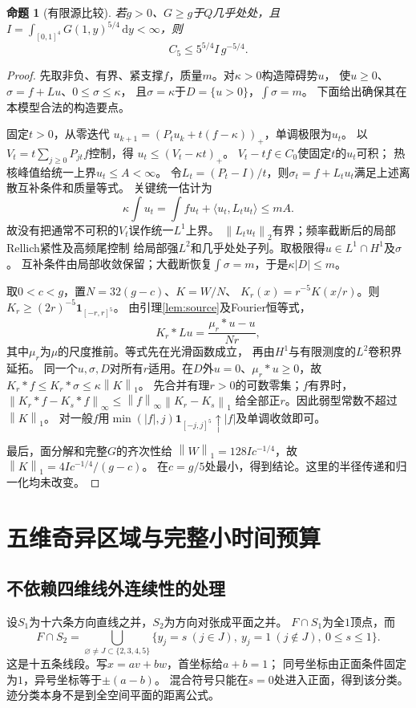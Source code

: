\documentclass[UTF8,fontset=fandol,zihao=-4,a4paper]{ctexart}
\newtheorem{proposition}[theorem]{命题}
\newcommand{\1}{\mathbf 1}
\newcommand{\dd}{\,\mathrm d}
\newcommand{\norm}[1]{\left\lVert#1\right\rVert}
\begin{document}
\begin{proposition}[有限源比较]\label{prop:transfer}
若$g>0$、$G\ge g$于$Q$几乎处处，且
$I=\int_{[0,1]^4}G(1,y)^{5/4}\dd y<\infty$，则
\[
 C_5\le5^{5/4}I\,g^{-5/4}.
\]
\end{proposition}
\begin{proof}
先取非负、有界、紧支撑$f$，质量$m$。对$\kappa>0$构造障碍势$u$，
使$u\ge0$、$\sigma=f+Lu$、$0\le\sigma\le\kappa$，
且$\sigma=\kappa$于$D=\{u>0\}$，$\int\sigma=m$。
下面给出确保其在本模型合法的构造要点。

固定$t>0$，从零迭代
$u_{k+1}=(P_tu_k+t(f-\kappa))_+$，单调极限为$u_t$。
以$V_t=t\sum_{j\ge0}P_{jt}f$控制，得
$u_t\le(V_t-\kappa t)_+$。
$V_t-tf\in C_0$使固定$t$的$u_t$可积；
热核峰值给统一上界$u_t\le A<\infty$。
令$L_t=(P_t-I)/t$，则$\sigma_t=f+L_tu_t$满足上述离散互补条件和质量等式。
关键统一估计为
\[
 \kappa\int u_t=\int fu_t+\langle u_t,L_tu_t\rangle\le mA.
\]
故没有把通常不可积的$V_t$误作统一$L^1$上界。
$\norm{L_tu_t}_2$有界；频率截断后的局部Rellich紧性及高频尾控制
给局部强$L^2$和几乎处处子列。取极限得$u\in L^1\cap H^1$及$\sigma$。
互补条件由局部收敛保留；大截断恢复$\int\sigma=m$，于是$\kappa|D|\le m$。

取$0<c<g$，置$N=32(g-c)$、$K=W/N$、
$K_r(x)=r^{-5}K(x/r)$。则
$K_r\ge(2r)^{-5}\1_{[-r,r]^5}$。
由引理\ref{lem:source}及Fourier恒等式，
\[
 K_r*Lu=\frac{\mu_r*u-u}{Nr},
\]
其中$\mu_r$为$\mu$的尺度推前。等式先在光滑函数成立，
再由$H^1$与有限测度的$L^2$卷积界延拓。
同一个$u,\sigma,D$对所有$r$适用。在$D$外$u=0$、$\mu_r*u\ge0$，故
$K_r*f\le K_r*\sigma\le\kappa\norm K_1$。
先合并有理$r>0$的可数零集；$f$有界时，
$\norm{K_r*f-K_s*f}_\infty\le\norm f_\infty\norm{K_r-K_s}_1$
给全部正$r$。因此弱型常数不超过$\norm K_1$。
对一般$f$用$\min(|f|,j)\1_{[-j,j]^5}\uparrow|f|$及单调收敛即可。

最后，面分解和完整$G$的齐次性给
$\norm W_1=128I c^{-1/4}$，故
$\norm K_1=4I c^{-1/4}/(g-c)$。
在$c=g/5$处最小，得到结论。这里的半径传递和归一化均未改变。
\end{proof}

\section{五维奇异区域与完整小时间预算}
\subsection{不依赖四维线外连续性的处理}
设$S_1$为十六条方向直线之并，$S_2$为方向对张成平面之并。
$F\cap S_1$为全$1$顶点，而
\[
 F\cap S_2=\bigcup_{\varnothing\ne J\subset\{2,3,4,5\}}
 \{y_j=s\ (j\in J),\ y_j=1\ (j\notin J),\ 0\le s\le1\}.
\]
这是十五条线段。写$x=av+bw$，首坐标给$a+b=1$；
同号坐标由正面条件固定为$1$，异号坐标等于$\pm(a-b)$。
混合符号只能在$s=0$处进入正面，得到该分类。
迹分类本身不是到全空间平面的距离公式。
\end{document}
